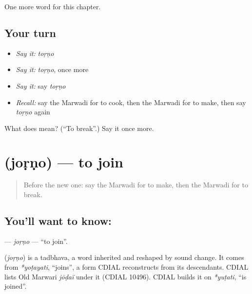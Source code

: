 \begin{grammarlens}[title={What you've built}]
One more word for this chapter.
\end{grammarlens}

\subsection*{Your turn}
\begin{itemize}
\raggedright
  \item \emph{Say it:} \emph{toṛṇo}
  \item \emph{Say it:} \emph{toṛṇo}, once more
  \item \emph{Say it:} say \emph{toṛṇo}
  \item \emph{Recall:} say the Marwadi for to cook, then the Marwadi for to make, then say \emph{toṛṇo} again
\end{itemize}

\begin{tcolorbox}[breakable,colback=teal!4,colframe=teal!35!black,title={Before you move on}]
What does  mean? (\textquotedblleft{}To break\textquotedblright{}.) Say it once more.
\end{tcolorbox}
\section[\texorpdfstring{\mw{जोड़णो} (joṛṇo)}{जोड़णो (joṛṇo)}]{ (joṛṇo) — to join}

\label{lesson:MW-C103-jorno}



\begin{quote}
Before the new one: say the Marwadi for to make, then the Marwadi for to break.
\end{quote}

\subsection*{You'll want to know: }
\textbf{} — \emph{joṛṇo} — \textquotedblleft{}to join\textquotedblright{}.

\begin{cousinweb}
\textbf{} (\emph{joṛṇo}) is a tadbhava, a word inherited and reshaped by sound change. It comes from \emph{*yoṭayati}, \textquotedblleft{}joins\textquotedblright{}, a form CDIAL reconstructs from its descendants. CDIAL lists Old Marwari \emph{jōḍaï} under it (CDIAL 10496). CDIAL builds it on \emph{*yuṭati}, \textquotedblleft{}is joined\textquotedblright{}.
\end{cousinweb}

